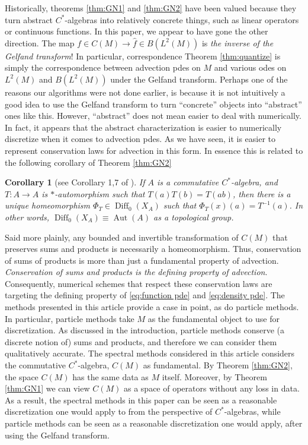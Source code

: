 \documentclass[final,leqno]{siamltex1213}
\newtheorem{cor}[thm]{Corollary}
\DeclareMathOperator{\Diff}{Diff}
\begin{document}
Historically, theorems \ref{thm:GN1} and \ref{thm:GN2} have been valued because they turn abstract $C^{*}$-algebras into relatively concrete things, such as linear operators or continuous functions.
In this paper, we appear to have gone the other direction.
The map $f \in C(M) \to \hat{f} \in B( L^{2}(M) )$ is \emph{the inverse of the Gelfand transform}!
In particular, correspondence Theorem \ref{thm:quantize} is simply the correspondence between advection pdes on $M$ and various odes on $L^{2}(M)$ and $B(L^{2}(M))$ under the Gelfand transform.
Perhaps one of the reasons our algorithms were not done earlier, is because it is not intuitively a good idea to use the Gelfand transform to turn ``concrete'' objects into ``abstract'' ones like this.
However, ``abstract'' does not mean easier to deal with numerically.
In fact, it appears that the abstract characterization is easier to numerically discretize when it comes to advection pdes.
As we have seen, it is easier to represent conservation laws for advection in this form.
In essence this is related to the following corollary of Theorem \ref{thm:GN2}

\begin{cor}[see Corollary 1,7 of \cite{Bondia2001}]
	If $A$ is a commutative $C^{*}$-algebra, and $T:A\to A$ is $*$-automorphism such that $T(a)T(b) = T(ab)$,
	then there is a unique homeomorphism $\Phi_{T} \in \Diff_{0}(X_{A})$
	such that $\Phi_{T}(x) (a) = T^{-1}(a)$.
	In other words, $\Diff_{0}(X_{A}) \equiv \operatorname{Aut}(A)$ as a topological group.
\end{cor}

Said more plainly, any bounded and invertible transformation of $C(M)$ that preserves sums and products is necessarily a homeomorphism.
Thus, conservation of sums of products is more than just a fundamental property of advection.
\emph{Conservation of sums and products is the defining property of advection}.
Consequently, numerical schemes that respect these conservation laws are targeting the defining property of \eqref{eq:function pde} and \eqref{eq:density pde}.
The methods presented in this article provide a case in point, as do particle methods.
In particular, particle methods take $M$ as the fundamental object to use for discretization.
As discussed in the introduction, particle methods conserve (a discrete notion of) sums and products, and therefore we can consider them qualitatively accurate.
The spectral methods considered in this article considers the commutative $C^{*}$-algebra, $C(M)$ as fundamental.
By Theorem \ref{thm:GN2}, the space $C(M)$ has the same data as $M$ itself.
Moreover, by Theorem \ref{thm:GN1} we can view $C(M)$ as a space of operators without any loss in data.
As a result, the spectral methods in this paper can be seen as a reasonable discretization one would apply to from the perspective of $C^{*}$-algebras,
while particle methods can be seen as a reasonable discretization one would apply, after using the Gelfand transform.
\end{document}
